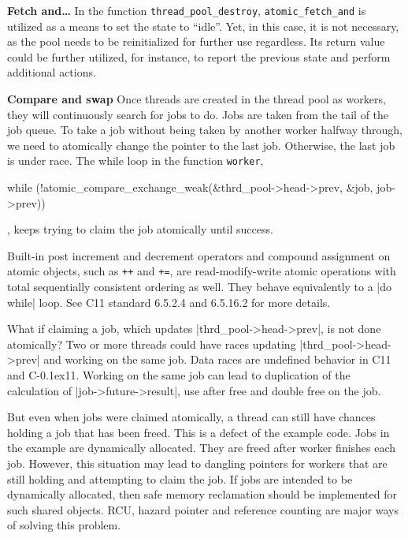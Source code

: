 \documentclass[fontsize=10pt, oneside]{scrartcl}
\newcommand{\monobox}[1]{\mbox{\texttt{#1}}}
\newcommand{\cplusplus}[1]{C\kern-0.1ex\raisebox{0.15ex}{\texttt{++}}}
\newcommand{\clang}[1]{C}
\begin{document}
\textbf{Fetch and…}
In the function \monobox{thread\_pool\_destroy}, \monobox{atomic\_fetch\_and} is utilized as a means to set the state to ``idle''. 
Yet, in this case, it is not necessary, as the pool needs to be reinitialized for further use regardless.
Its return value could be further utilized, for instance, to report the previous state and perform additional actions.

\textbf{Compare and swap}
Once threads are created in the thread pool as workers, they will continuously search for jobs to do.
Jobs are taken from the tail of the job queue.
To take a job without being taken by another worker halfway through, we need to atomically change the pointer to the last job. 
Otherwise, the last job is under race.
The while loop in the function \monobox{worker},
\begin{ccode}
while (!atomic_compare_exchange_weak(&thrd_pool->head->prev, &job,
                                       job->prev)) {
}
\end{ccode}
, keeps trying to claim the job atomically until success.

Built-in post increment and decrement operators and compound assignment on atomic objects, such as \monobox{++} and \monobox{+=}, are read-modify-write atomic operations with total sequentially consistent ordering as well. 
They behave equivalently to a \cc|do while| loop. See \clang{}11 standard 6.5.2.4 and 6.5.16.2 for more details.

What if claiming a job, which updates \cc|thrd_pool->head->prev|, is not done atomically?
Two or more threads could have races updating \cc|thrd_pool->head->prev| and working on the same job.
Data races are undefined behavior in \clang{}11 and \cplusplus{}11.
Working on the same job can lead to duplication of the calculation of \cc|job->future->result|, 
use after free and double free on the job.

But even when jobs were claimed atomically, a thread can still have chances holding a job that has been freed.
This is a defect of the example code.
Jobs in the example are dynamically allocated. They are freed after worker finishes each job. 
However, this situation may lead to dangling pointers for workers that are still holding and attempting to claim the job. 
If jobs are intended to be dynamically allocated, then safe memory reclamation should be implemented for such shared objects.
RCU, hazard pointer and reference counting are major ways of solving this problem.
\end{document}
